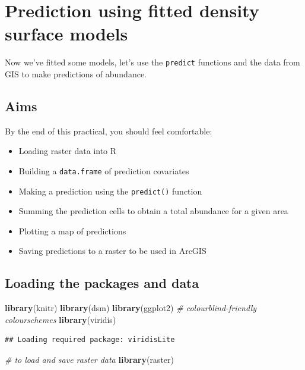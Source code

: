\documentclass[]{book}
\newenvironment{Shaded}{\begin{snugshade}}{\end{snugshade}}
\newcommand{\KeywordTok}[1]{\textcolor[rgb]{0.13,0.29,0.53}{\textbf{#1}}}
\newcommand{\CommentTok}[1]{\textcolor[rgb]{0.56,0.35,0.01}{\textit{#1}}}
\newcommand{\NormalTok}[1]{#1}
\providecommand{\tightlist}{%
  \setlength{\itemsep}{0pt}\setlength{\parskip}{0pt}}
\theoremstyle{definition}
\theoremstyle{definition}
\theoremstyle{remark}
\begin{document}
\chapter{Prediction using fitted density surface
models}\label{prediction-using-fitted-density-surface-models}

Now we've fitted some models, let's use the \texttt{predict} functions
and the data from GIS to make predictions of abundance.

\section{Aims}\label{aims-4}

By the end of this practical, you should feel comfortable:

\begin{itemize}
\tightlist
\item
  Loading raster data into R
\item
  Building a \texttt{data.frame} of prediction covariates
\item
  Making a prediction using the \texttt{predict()} function
\item
  Summing the prediction cells to obtain a total abundance for a given
  area
\item
  Plotting a map of predictions
\item
  Saving predictions to a raster to be used in ArcGIS
\end{itemize}

\section{Loading the packages and
data}\label{loading-the-packages-and-data}

\begin{Shaded}
\begin{Highlighting}[]
\KeywordTok{library}\NormalTok{(knitr)}
\KeywordTok{library}\NormalTok{(dsm)}
\KeywordTok{library}\NormalTok{(ggplot2)}
\CommentTok{# colourblind-friendly colourschemes}
\KeywordTok{library}\NormalTok{(viridis)}
\end{Highlighting}
\end{Shaded}

\begin{verbatim}
## Loading required package: viridisLite
\end{verbatim}

\begin{Shaded}
\begin{Highlighting}[]
\CommentTok{# to load and save raster data}
\KeywordTok{library}\NormalTok{(raster)}
\end{Highlighting}
\end{Shaded}
\end{document}
